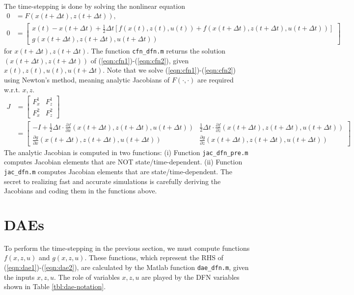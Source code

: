 \documentclass[12pt]{article}
\begin{document}
The time-stepping is done by solving the nonlinear equation
\begin{align}
	 0 &= F(x(t + \Delta t), z(t + \Delta t)), \label{eqn:cfn1} \\
0 &= \left[
\begin{array}{c}
  x(t) - x(t+\Delta t) + \frac{1}{2} \Delta t \left[ f(x(t), z(t), u(t)) + f(x(t+\Delta t), z(t+\Delta t), u(t+\Delta t)) \right] \\
  g\left(x(t+\Delta t), z(t+\Delta t), u(t + \Delta t) \right)
\end{array}
\right] \label{eqn:cfn2}
\end{align} 
for $x(t+\Delta t), z(t+\Delta t)$. The function \texttt{cfn\_dfn.m} returns the solution $\left(x(t+\Delta t), z(t+\Delta t)\right)$ of (\ref{eqn:cfn1})-(\ref{eqn:cfn2}), given $x(t), z(t), u(t), u(t+\Delta t)$. Note that we solve (\ref{eqn:cfn1})-(\ref{eqn:cfn2}) using Newton's method, meaning analytic Jacobians of $F(\cdot, \cdot)$ are required w.r.t. $x,z$.
\begin{align}
J &=
\left[
\begin{array}{cc}
 F^{1}_{x} & F^{1}_{z}  \\
 F^{2}_{x} & F^{2}_{z}
\end{array}
\right] \\
&= 
\left[
\begin{array}{cc}
 -I + \frac{1}{2} \Delta t \cdot \frac{\partial f}{\partial x}(x(t+\Delta t),z(t+\Delta t),u(t+\Delta t)) & \frac{1}{2} \Delta t \cdot \frac{\partial f}{\partial z}(x(t+\Delta t),z(t+\Delta t),u(t+\Delta t))  \\
 \frac{\partial g}{\partial x}(x(t+\Delta t),z(t+\Delta t),u(t+\Delta t)) & \frac{\partial g}{\partial z}(x(t+\Delta t),z(t+\Delta t),u(t+\Delta t))
\end{array}
\right]
\end{align}
The analytic Jacobian is computed in two functions: (i) Function \texttt{jac\_dfn\_pre.m} computes Jacobian elements that are NOT state/time-dependent. (ii) Function \texttt{jac\_dfn.m} computes Jacobian elements that are state/time-dependent. The secret to realizing fast and accurate simulations is carefully deriving the Jacobians and coding them in the functions above.

\section{DAEs}\label{sec:daes}
To perform the time-stepping in the previous section, we must compute functions $f(x,z,u)$ and $g(x,z,u)$. These functions, which represent the RHS of (\ref{eqn:dae1})-(\ref{eqn:dae2}), are calculated by the Matlab function \texttt{dae\_dfn.m}, given the inputs $x,z,u$. The role of variables $x,z,u$ are played by the DFN variables shown in Table \ref{tbl:dae-notation}.
\end{document}
